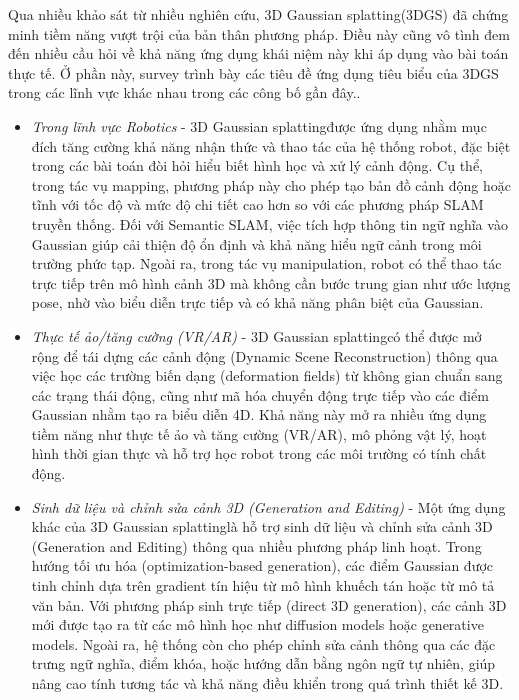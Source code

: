         Qua nhiều khảo sát từ nhiều nghiên cứu, 3D Gaussian splatting(3DGS) đã chứng minh tiềm năng vượt trội của bản thân phương pháp. Điều này cũng vô tình đem đến nhiều cầu hỏi về khả năng ứng dụng khái niệm này khi áp dụng vào bài toán thực tế. Ở phần này, survey trình bày các tiêu đề ứng dụng tiêu biểu của 3DGS trong các lĩnh vực khác nhau trong các công bố gần đây..\\

        \begin{itemize}
        
        \item \textit{Trong lĩnh vực Robotics} - 3D Gaussian splattingđược ứng dụng nhằm mục đích tăng cường khả năng nhận thức và thao tác của hệ thống robot, đặc biệt trong các bài toán đòi hỏi hiểu biết hình học và xử lý cảnh động. Cụ thể, trong tác vụ mapping, phương pháp này cho phép tạo bản đồ cảnh động hoặc tĩnh với tốc độ và mức độ chi tiết cao hơn so với các phương pháp SLAM truyền thống. Đối với Semantic SLAM, việc tích hợp thông tin ngữ nghĩa vào Gaussian giúp cải thiện độ ổn định và khả năng hiểu ngữ cảnh trong môi trường phức tạp. Ngoài ra, trong tác vụ manipulation, robot có thể thao tác trực tiếp trên mô hình cảnh 3D mà không cần bước trung gian như ước lượng pose, nhờ vào biểu diễn trực tiếp và có khả năng phân biệt của Gaussian.\\
        
        \item \textit{Thực tế ảo/tăng cường (VR/AR)} - 3D Gaussian splattingcó thể được mở rộng để tái dựng các cảnh động (Dynamic Scene Reconstruction) thông qua việc học các trường biến dạng (deformation fields) từ không gian chuẩn sang các trạng thái động, cũng như mã hóa chuyển động trực tiếp vào các điểm Gaussian nhằm tạo ra biểu diễn 4D. Khả năng này mở ra nhiều ứng dụng tiềm năng như thực tế ảo và tăng cường (VR/AR), mô phỏng vật lý, hoạt hình thời gian thực và hỗ trợ học robot trong các môi trường có tính chất động.\\
        
        \item \textit{Sinh dữ liệu và chỉnh sửa cảnh 3D (Generation and Editing)} - Một ứng dụng khác của 3D Gaussian splattinglà hỗ trợ sinh dữ liệu và chỉnh sửa cảnh 3D (Generation and Editing) thông qua nhiều phương pháp linh hoạt. Trong hướng tối ưu hóa (optimization-based generation), các điểm Gaussian được tinh chỉnh dựa trên gradient tín hiệu từ mô hình khuếch tán hoặc từ mô tả văn bản. Với phương pháp sinh trực tiếp (direct 3D generation), các cảnh 3D mới được tạo ra từ các mô hình học như diffusion models hoặc generative models. Ngoài ra, hệ thống còn cho phép chỉnh sửa cảnh thông qua các đặc trưng ngữ nghĩa, điểm khóa, hoặc hướng dẫn bằng ngôn ngữ tự nhiên, giúp nâng cao tính tương tác và khả năng điều khiển trong quá trình thiết kế 3D.\\
        

\end{itemize}
